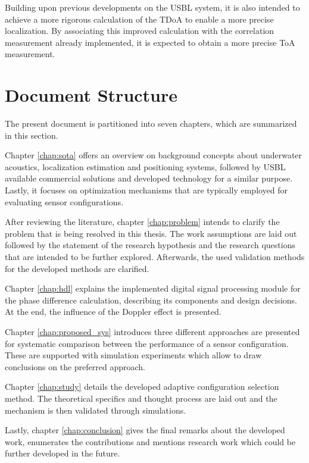 Building upon previous developments on the USBL system, it is also intended to achieve a more rigorous calculation of the TDoA to enable a more precise localization. By associating this improved calculation with the correlation measurement already implemented, it is expected to obtain a more precise ToA measurement. 

\section{Document Structure}

The present document is partitioned into seven chapters, which are summarized in this section.

Chapter \ref{chap:sota} offers an overview on background concepts about underwater acoustics, localization estimation and positioning systems, followed by USBL available commercial solutions and developed technology for a similar purpose. Lastly, it focuses on optimization mechanisms that are typically employed for evaluating sensor configurations.

After reviewing the literature, chapter \ref{chap:problem} intends to clarify the problem that is being resolved in this thesis. The work assumptions are laid out followed by the statement of the research hypothesis and the research questions that are intended to be further explored. Afterwards, the used validation methods for the developed methods are clarified. 

Chapter \ref{chap:hdl} explains the implemented digital signal processing module for the phase difference calculation, describing its components and design decisions. At the end, the influence of the Doppler effect is presented.

Chapter \ref{chap:proposed_sys} introduces three different approaches are presented for systematic comparison between the performance of a sensor configuration. These are supported with simulation experiments which allow to draw conclusions on the preferred approach.

Chapter \ref{chap:study} details the developed adaptive configuration selection method. The theoretical specifics and thought process are laid out and the mechanism is then validated through simulations.

Lastly, chapter \ref{chap:conclusion} gives the final remarks about the developed work, enumerates the contributions and mentions research work which could be further developed in the future.  

